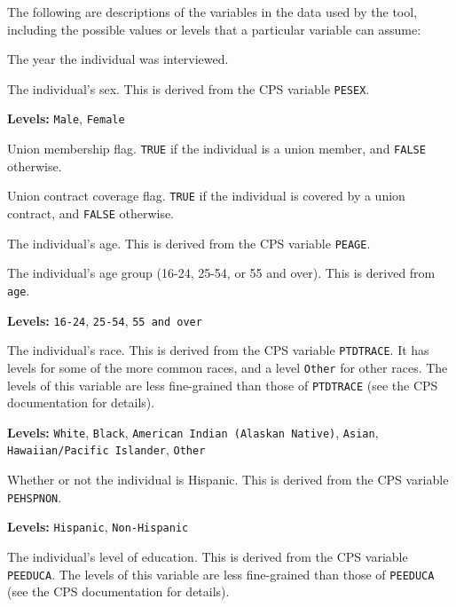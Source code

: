 \documentclass[letterpaper,12pt]{article}
\begin{document}
The following are descriptions of the variables in the data used by
the tool, including the possible values or levels that a particular
variable can assume:
\begin{description}[style=multiline,leftmargin=3cm,font=\normalfont]
\item[\texttt{year}] The year the individual was interviewed.

\item[\texttt{sex}] The individual's sex. This is derived from the CPS
  variable \texttt{PESEX}.

  \textbf{Levels:} \texttt{Male}, \texttt{Female}

\item[\texttt{member}] Union membership flag. \texttt{TRUE} if the
  individual is a union member, and \texttt{FALSE} otherwise.

\item[\texttt{covered}] Union contract coverage flag. \texttt{TRUE} if
  the individual is covered by a union contract, and \texttt{FALSE}
  otherwise.

\item[\texttt{age}] The individual's age. This is derived from the CPS
  variable \texttt{PEAGE}.

\item[\texttt{age\_group}] The individual's age group (16-24, 25-54,
  or 55 and over). This is derived from \texttt{age}.

  \textbf{Levels:} \texttt{16-24}, \texttt{25-54}, \texttt{55 and
    over}

\item[\texttt{race}] The individual's race. This is derived from the
  CPS variable \texttt{PTDTRACE}. It has levels for some of the more
  common races, and a level \texttt{Other} for other races. The levels
  of this variable are less fine-grained than those of
  \texttt{PTDTRACE} (see the CPS documentation for details).

  \textbf{Levels:} \texttt{White}, \texttt{Black}, \texttt{American
    Indian (Alaskan Native)}, \texttt{Asian}, \texttt{Hawaiian/Pacific
    Islander}, \texttt{Other}

\item[\texttt{hisp}] Whether or not the individual is Hispanic. This
  is derived from the CPS variable \texttt{PEHSPNON}.

  \textbf{Levels:} \texttt{Hispanic}, \texttt{Non-Hispanic}

\item[\texttt{educ}] The individual's level of education. This is
  derived from the CPS variable \texttt{PEEDUCA}. The levels of this
  variable are less fine-grained than those of \texttt{PEEDUCA} (see
  the CPS documentation for details).


\end{description}
\end{document}
